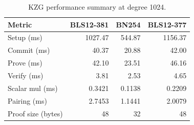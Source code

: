 \begin{table}[H]
\centering
\caption{KZG performance summary at degree 1024.}
\label{tab:kzg-summary}
\begin{tabular}{lrrr}
\toprule
\textbf{Metric} & \textbf{BLS12-381} & \textbf{BN254} & \textbf{BLS12-377} \\
\midrule
Setup (ms)         & 1027.47 & 544.87 & 1156.37 \\
Commit (ms)        & 40.37   & 20.88  & 42.00   \\
Prove (ms)         & 42.10   & 23.51  & 46.16   \\
Verify (ms)        & 3.81    & 2.53   & 4.65    \\
Scalar mul (ms)    & 0.3421  & 0.1138 & 0.2209  \\
Pairing (ms)       & 2.7453  & 1.1441 & 2.0079  \\
Proof size (bytes) & 48      & 32     & 48      \\
\bottomrule
\end{tabular}
\end{table}